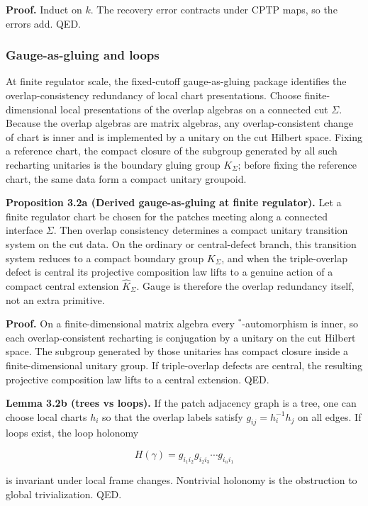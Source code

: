 \textbf{Proof.} Induct on \(k\). The recovery error contracts under CPTP maps, so the errors add. QED.

\subsubsection{Gauge-as-gluing and loops}\label{32-gauge-as-gluing-and-loops}

At finite regulator scale, the fixed-cutoff gauge-as-gluing package identifies the overlap-consistency redundancy of local chart presentations. Choose finite-dimensional local presentations of the overlap algebras on a connected cut \(\Sigma\). Because the overlap algebras are matrix algebras, any overlap-consistent change of chart is inner and is implemented by a unitary on the cut Hilbert space. Fixing a reference chart, the compact closure of the subgroup generated by all such recharting unitaries is the boundary gluing group \(K_\Sigma\); before fixing the reference chart, the same data form a compact unitary groupoid.

\textbf{Proposition 3.2a (Derived gauge-as-gluing at finite regulator).} Let a finite regulator chart be chosen for the patches meeting along a connected interface \(\Sigma\). Then overlap consistency determines a compact unitary transition system on the cut data. On the ordinary or central-defect branch, this transition system reduces to a compact boundary group \(K_\Sigma\), and when the triple-overlap defect is central its projective composition law lifts to a genuine action of a compact central extension \(\widehat K_\Sigma\). Gauge is therefore the overlap redundancy itself, not an extra primitive.

\textbf{Proof.} On a finite-dimensional matrix algebra every \(^*\)-automorphism is inner, so each overlap-consistent recharting is conjugation by a unitary on the cut Hilbert space. The subgroup generated by those unitaries has compact closure inside a finite-dimensional unitary group. If triple-overlap defects are central, the resulting projective composition law lifts to a central extension. QED.

\textbf{Lemma 3.2b (trees vs loops).} If the patch adjacency graph is a tree, one can choose local charts \(h_i\) so that the overlap labels satisfy \(g_{ij} = h_i^{-1} h_j\) on all edges. If loops exist, the loop holonomy

\[
H(\gamma) = g_{i_1 i_2} g_{i_2 i_3} \cdots g_{i_n i_1}
\]

is invariant under local frame changes. Nontrivial holonomy is the obstruction to global trivialization. QED.


